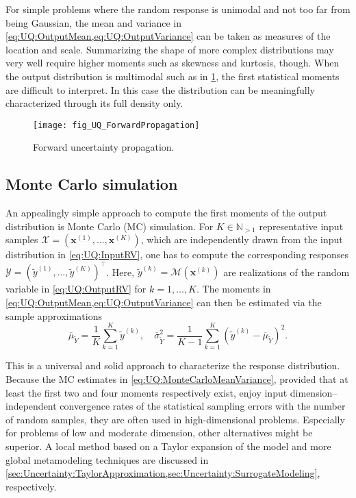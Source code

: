For simple problems where the random response is unimodal and not too far from being Gaussian,
the mean and variance in \cref{eq:UQ:OutputMean,eq:UQ:OutputVariance} can be taken as measures of the location and scale.
Summarizing the shape of more complex distributions may very well require higher moments such as skewness and kurtosis, though.
When the output distribution is multimodal such as in \cref{fig:UQ:ForwardPropagation}, the first statistical moments are difficult to interpret.
In this case the distribution can be meaningfully characterized through its full density only.
\begin{figure}[htbp]
  \centering
  \texttt{[image: fig\_UQ\_ForwardPropagation]}
  \caption[Forward uncertainty propagation]{Forward uncertainty propagation.}
  \label{fig:UQ:ForwardPropagation}
\end{figure}

\subsection{Monte Carlo simulation}
An appealingly simple approach to compute the first moments of the output distribution is Monte Carlo (MC) simulation.
For \(K \in \mathds{N}_{>1}\) representative input samples \(\mathcal{X} = (\bm{x}^{(1)},\ldots,\bm{x}^{(K)})\),
which are independently drawn from the input distribution in \cref{eq:UQ:InputRV},
one has to compute the corresponding responses \(\mathcal{Y} = (\tilde{y}^{(1)},\ldots,\tilde{y}^{(K)})^\top\).
Here, \(\tilde{y}^{(k)} = \mathcal{M}(\bm{x}^{(k)})\) are realizations of the random variable in \cref{eq:UQ:OutputRV} for \(k = 1,\ldots,K\).
The moments in \cref{eq:UQ:OutputMean,eq:UQ:OutputVariance} can then be estimated via the sample approximations
\begin{equation} \label{eq:UQ:MonteCarloMeanVariance}
  \overline{\mu}_{\tilde{Y}} = \frac{1}{K} \sum\limits_{k=1}^K \tilde{y}^{(k)}, \quad
  \overline{\sigma}_{\tilde{Y}}^2 = \frac{1}{K-1} \sum\limits_{k=1}^K \left( \tilde{y}^{(k)} - \overline{\mu}_{\tilde{Y}} \right)^2.
\end{equation}
\par %
This is a universal and solid approach to characterize the response distribution.
Because the MC estimates in \cref{eq:UQ:MonteCarloMeanVariance}, provided that at least the first two and four moments respectively exist,
enjoy input dimension--independent convergence rates of the statistical sampling errors with the number of random samples,
they are often used in high-dimensional problems.
Especially for problems of low and moderate dimension, other alternatives might be superior.
A local method based on a Taylor expansion of the model and more global metamodeling techniques are discussed
in \cref{sec:Uncertainty:TaylorApproximation,sec:Uncertainty:SurrogateModeling}, respectively.